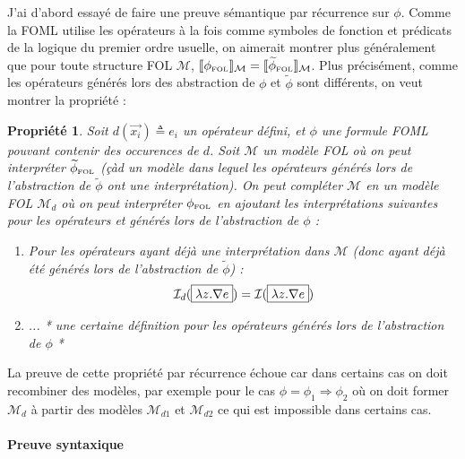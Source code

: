 \documentclass[12pt]{article}
\newcommand{\FOL}{\ensuremath{\textup{\tiny{}FOL}}}
\newcommand{\M}{\ensuremath{\mathcal{M}}}
\newcommand{\I}{\ensuremath{\mathcal{I}}}
\newcommand{\bpar}[1]{\marginpar{\color{myblue}\footnotesize\raggedright#1}}
\newtheorem{prop}{Propriété}
\begin{document}
J'ai d'abord essayé de faire une preuve sémantique par récurrence sur $\phi$.
Comme la FOML utilise les opérateurs à la fois comme symboles de fonction et prédicats de la logique du premier ordre usuelle, on aimerait montrer plus généralement que pour toute structure FOL $\M$, $\llbracket \phi_\FOL \rrbracket_\M = \llbracket \widetilde{\phi}_\FOL \rrbracket_\M$.
Plus précisément, comme les opérateurs générés lors des abstraction de $\phi$ et $\widetilde{\phi}$ sont différents, on veut montrer la propriété :
\begin{prop}
Soit $d(\vec{x_i}) \triangleq e_i$ un opérateur défini, et $\phi$ une formule FOML pouvant contenir des occurences de $d$.
Soit $\mathcal{M}$ un modèle FOL où on peut interpréter $\widetilde{\phi}_\FOL$ (çàd un modèle dans lequel les opérateurs  générés lors de l'abstraction de $\widetilde{\phi}$ ont une interprétation).
On peut compléter $\M$ en un modèle FOL $\M_d$ où on peut interpréter $\phi_\FOL$ en ajoutant les interprétations suivantes pour les opérateurs  et  générés lors de l'abstraction de $\phi$ :
\begin{enumerate}
\item
  Pour les opérateurs  ayant déjà une interprétation dans $\M$ (donc ayant déjà été générés lors de l'abstraction de $\widetilde{\phi}$) :
  \[ \I_d(\framebox{$\lambda z . \nabla e$}) = \I(\framebox{$\lambda z . \nabla e$}) \]
\item ... * une certaine définition pour les opérateurs générés lors de l'abstraction de $\phi$ *
\end{enumerate}
\end{prop}

La preuve de cette propriété par récurrence échoue car dans certains cas on doit recombiner des modèles, par exemple pour le cas $\phi = \phi_1 \Rightarrow \phi_2$ où on doit former $\M_d$ à partir des modèles $\M_{d1}$ et $\M_{d2}$ ce qui est impossible dans certains cas.

\paragraph{Preuve syntaxique}
\end{document}
